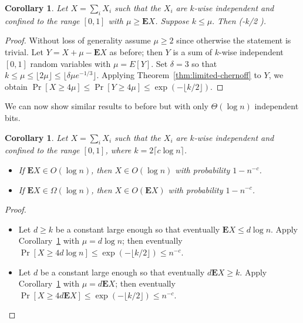 \documentclass[11pt,a4paper]{article}
\newtheorem{corollary}[theorem]{Corollary}
\newcommand*{\E}[0]{\mathbf{E}}
\def\[#1\]{\begin{align*}#1\end{align*}}
\begin{document}
\begin{tcolorbox}
  \begin{corollary}
    \label{cor:limited-chernoff-simple}
    Let \(X = \sum_i X_i\) such that the \(X_i\) are \(k\)-wise independent and confined to the range \([0, 1]\) with \(\mu \ge \E X\).
    Suppose \(k \le \mu.\)
    Then \[\Pr[X \ge 4\mu] \le \exp(-\lfloor k/2 \rfloor).\]
  \end{corollary}
\end{tcolorbox}
\begin{proof}
  Without loss of generality assume \(\mu \ge 2\) since otherwise the statement is trivial.
  Let \(Y = X + \mu - \E X\) as before; then \(Y\) is a sum of \(k\)-wise independent \([0, 1]\) random variables with \(\mu = E[Y]\).
  Set \(\delta = 3\) so that \(k \le \mu \le \lfloor 2\mu \rfloor \le \lfloor \delta \mu e^{-1/3} \rfloor\).
  Applying Theorem~\ref{thm:limited-chernoff} to \(Y\), we obtain
  \(\Pr[X \ge 4\mu] \le \Pr[Y \ge 4\mu] \le \exp(-\lfloor k/2 \rfloor).\)
\end{proof}

We can now show similar results to before but with only \(\Theta(\log n)\) independent bits.

\begin{tcolorbox}
  \begin{corollary}
    Let \(X = \sum_i X_i\) such that the \(X_i\) are \(k\)-wise independent and confined to the range \([0, 1]\), where \(k = 2\lceil c\log n \rceil\).
    \begin{itemize}
    \item If \(\E X \in O(\log n)\), then  \(X \in O(\log n)\) with probability \(1 - n^{-c}\).
    \item If \(\E X \in \Omega(\log n)\), then \(X \in O(\E X)\) with probability \(1 - n^{-c}\).
    \end{itemize}
  \end{corollary}
\end{tcolorbox}
\begin{proof}\hfill
  \begin{itemize}
  \item
    Let \(d \ge k\) be a constant large enough so that eventually \(\E X \le d \log n\).
    Apply Corollary~\ref{cor:limited-chernoff-simple} with \(\mu = d \log n\); 
    then eventually \(\Pr[X \ge 4d \log n] \le \exp(-\lfloor k/2 \rfloor) \le n^{-c}\).
  \item
    Let \(d\) be a constant large enough so that eventually \(d \E X \ge k\).
    Apply Corollary~\ref{cor:limited-chernoff-simple} with \(\mu = d\E X\);
    then eventually \(\Pr[X \ge 4d\E X] \le \exp(-\lfloor k/2 \rfloor) \le n^{-c}\).
  \end{itemize}
\end{proof}
\end{document}
